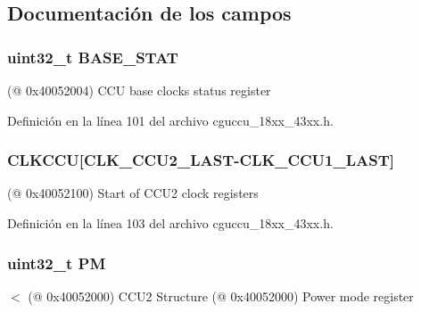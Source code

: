 \subsection{Documentación de los campos}
\subsubsection[{\texorpdfstring{B\+A\+S\+E\+\_\+\+S\+T\+AT}{BASE_STAT}}]{ uint32\+\_\+t B\+A\+S\+E\+\_\+\+S\+T\+AT}\hypertarget{struct_l_p_c___c_c_u2___t_aa450381b00ff7d07b6cb5fbcf761dfdc}{}\label{struct_l_p_c___c_c_u2___t_aa450381b00ff7d07b6cb5fbcf761dfdc}
(@ 0x40052004) C\+CU base clocks status register 

Definición en la línea 101 del archivo cguccu\+\_\+18xx\+\_\+43xx.\+h.

\subsubsection[{\texorpdfstring{C\+L\+K\+C\+CU}{CLKCCU}}]{ C\+L\+K\+C\+CU\mbox{[}{\bf C\+L\+K\+\_\+\+C\+C\+U2\+\_\+\+L\+A\+ST}-\/{\bf C\+L\+K\+\_\+\+C\+C\+U1\+\_\+\+L\+A\+ST}\mbox{]}}\hypertarget{struct_l_p_c___c_c_u2___t_a39c975a395ae2f859179c174fde474e7}{}\label{struct_l_p_c___c_c_u2___t_a39c975a395ae2f859179c174fde474e7}
(@ 0x40052100) Start of C\+C\+U2 clock registers 

Definición en la línea 103 del archivo cguccu\+\_\+18xx\+\_\+43xx.\+h.

\subsubsection[{\texorpdfstring{PM}{PM}}]{ uint32\+\_\+t PM}\hypertarget{struct_l_p_c___c_c_u2___t_a3d44c3611cd3eaefe7d7214409ef00b8}{}\label{struct_l_p_c___c_c_u2___t_a3d44c3611cd3eaefe7d7214409ef00b8}
$<$ (@ 0x40052000) C\+C\+U2 Structure (@ 0x40052000) Power mode register 

